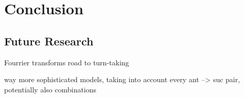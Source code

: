 

\chapter{Conclusion}
\label{ch:conclusion}
\section{Future Research}
\label{sec:conclusionfuture}
Fourrier transforms
road to turn-taking

way more sophisticated models, taking into account every ant --> suc pair, potentially also combinations